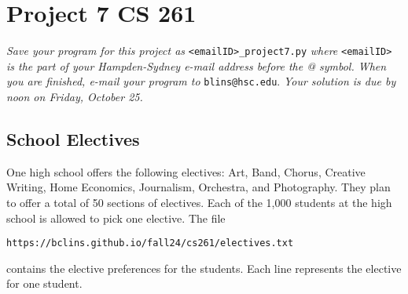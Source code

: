 \documentclass[12pt]{article}
\begin{document}
\section*{Project 7 \hfill CS 261}

\textit{Save your program for this project as} \verb|<emailID>_project7.py| \textit{where} \verb|<emailID>| \textit{is the part of your Hampden-Sydney e-mail address before the @ symbol. When you are finished, e-mail your program to} \verb|blins@hsc.edu|. \textit{Your solution is due by noon on Friday, October 25. }

\subsection*{School Electives}

One high school offers the following electives: Art, Band, Chorus, Creative Writing, Home Economics, Journalism, Orchestra, and Photography. They plan to offer a total of 50 sections of electives. Each of the 1{,}000 students at the high school is allowed to pick one elective.  The file 
\begin{center}
\verb|https://bclins.github.io/fall24/cs261/electives.txt|
\end{center}
contains the elective preferences for the students.  Each line represents the elective for one student.  
\end{document}
